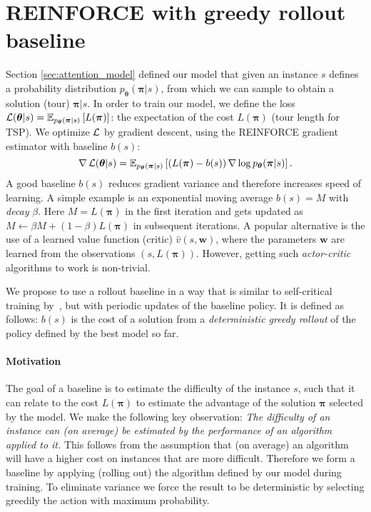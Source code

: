 \section{REINFORCE with greedy rollout baseline}

\label{sec:reinforce_baseline}
Section \ref{sec:attention_model} defined our model that given an instance $s$ defines a probability distribution $p_{\bm{\theta}}(\bm{\pi} | s)$, from which we can sample to obtain a solution (tour) $\bm{\pi}|s$. In order to train our model, we define the loss $\operatorname{\mathcal{L}}(\bm{\theta} | s) = \mathbb{E}_{p_{\bm{\theta}}(\bm{\pi} | s)}\left[L(\bm{\pi})\right]$: the expectation of the cost $L(\bm{\pi})$ (tour length for TSP).
We optimize $\operatorname{\mathcal{L}}$ by gradient descent, using the REINFORCE \citep{williams1992simple} gradient estimator with baseline $b(s)$:
\begin{equation}
\label{eq:reinforce_baseline}
	\nabla \operatorname{\mathcal{L}}(\bm{\theta} | s) = \mathbb{E}_{p_{\bm{\theta}}(\bm{\pi} | s)}\left[\left(L(\bm{\pi}) - b(s)\right) \nabla \log p_{\bm{\theta}}(\bm{\pi} | s)\right].
\end{equation}
A good baseline $b(s)$ reduces gradient variance and therefore increases speed of learning. A simple example is an exponential moving average $b(s) = M$ with \emph{decay} $\beta$. Here $M = L(\bm{\pi})$ in the first iteration and gets updated as $M \leftarrow \beta M + (1 - \beta) L(\bm{\pi})$ in subsequent iterations. A popular alternative is the use of a learned value function (critic) $\hat{v}(s, \bm{w})$, where the parameters $\bm{w}$ are learned from the observations $(s, L(\bm{\pi}))$. However, getting such \emph{actor-critic} algorithms to work is non-trivial.

We propose to use a rollout baseline in a way that is similar to self-critical training by~\citet{rennie2017self}, but with periodic updates of the baseline policy. It is defined as follows: $b(s)$ is the cost of a solution from a \emph{deterministic greedy rollout} of the policy defined by the best model so far.

\paragraph{Motivation}
The goal of a baseline is to estimate the difficulty of the instance $s$, such that it can relate to the cost $L(\bm{\pi})$ to estimate the advantage of the solution $\bm{\pi}$ selected by the model. We make the following key observation:
\emph{The difficulty of an instance can (on average) be estimated by the performance of an algorithm applied to it.}
This follows from the assumption that (on average) an algorithm will have a higher cost on instances that are more difficult. Therefore we form a baseline by applying (rolling out) the algorithm defined by our model during training. To eliminate variance we force the result to be deterministic by selecting greedily the action with maximum probability.

